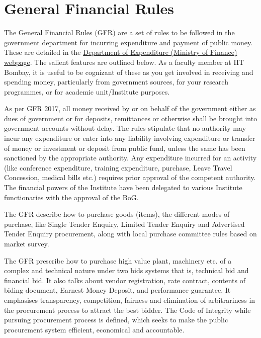 \documentclass[
  10pt,
  a5paper,
  10pt,
  openany]{amsbook}
\begin{document}
\chapter{General Financial Rules}\label{general-financial-rules}

The General Financial Rules (GFR) are a set of rules to be followed in
the government department for incurring expenditure and payment of
public money. These are detailed in the
\href{https://doe.gov.in/order-circular/general-financial-rules2017-0}{Department
of Expenditure (Ministry of Finance) webpage}. The salient features are
outlined below. As a faculty member at IIT Bombay, it is useful to be
cognizant of these as you get involved in receiving and spending money,
particularly from government sources, for your research programmes, or
for academic unit/Institute purposes.

As per GFR 2017, all money received by or on behalf of the government
either as dues of government or for deposits, remittances or otherwise
shall be brought into government accounts without delay. The rules
stipulate that no authority may incur any expenditure or enter into any
liability involving expenditure or transfer of money or investment or
deposit from public fund, unless the same has been sanctioned by the
appropriate authority. Any expenditure incurred for an activity (like
conference expenditure, training expenditure, purchase, Leave Travel
Concession, medical bills etc.) requires prior approval of the competent
authority. The financial powers of the Institute have been delegated to
various Institute functionaries with the approval of the BoG.

The GFR describe how to purchase goods (items), the different modes of
purchase, like Single Tender Enquiry, Limited Tender Enquiry and
Advertised Tender Enquiry procurement, along with local purchase
committee rules based on market survey.

The GFR prescribe how to purchase high value plant, machinery etc. of a
complex and technical nature under two bids systems that is, technical
bid and financial bid. It also talks about vendor registration, rate
contract, contents of biding document, Earnest Money Deposit, and
performance guarantee. It emphasises transparency, competition, fairness
and elimination of arbitrariness in the procurement process to attract
the best bidder. The Code of Integrity while pursuing procurement
process is defined, which seeks to make the public procurement system
efficient, economical and accountable.
\end{document}
